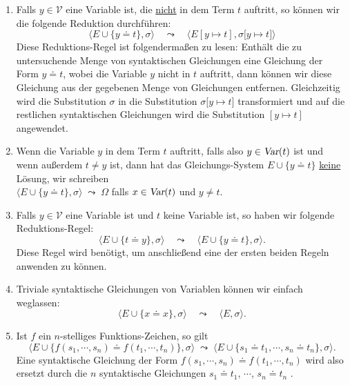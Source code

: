 \begin{enumerate}
\item Falls $y\in\mathcal{V}$ eine Variable ist, die \underline{\color{red}nicht} in dem Term $t$ auftritt, so
      können wir die folgende Reduktion durchführen: 
      \[ \Big\langle E \cup \big\{ y \doteq t \big\}, \sigma \Big\rangle \quad\leadsto\quad 
         \Big\langle E[y \mapsto t], \sigma\big[ y \mapsto t \big] \Big\rangle 
      \]
      Diese Reduktions-Regel ist folgendermaßen zu lesen: Enthält die zu untersuchende
      Menge von syntaktischen Gleichungen eine Gleichung der Form $y \doteq t$, wobei die
      Variable $y$ nicht in $t$ auftritt, dann können wir diese Gleichung aus der
      gegebenen Menge von Gleichungen entfernen.  Gleichzeitig wird die Substitution
      $\sigma$ in die Substitution $\sigma\big[ y \mapsto t \big]$ transformiert und auf die restlichen syntaktischen Gleichungen
      wird die Substitution $[y \mapsto t]$ angewendet.
\item Wenn die Variable $y$  in dem Term $t$ auftritt, falls also $y \in \textsl{Var}(t)$
      ist und wenn außerdem $t \not= y$ ist, dann hat das Gleichungs-System 
      $E \cup \big\{ y \doteq t \big\}$ \underline{\color{red}keine} Lösung, wir schreiben 
      \\[0.2cm]
      \hspace*{1.3cm}
      $\Big\langle E \cup \big\{ y \doteq t \big\}, \sigma \Big\rangle\;\leadsto\; \Omega$ \quad
      falls $x \in \textsl{Var}(t)$ und $y \not=t$.
\item Falls $y\in\mathcal{V}$ eine Variable ist und $t$ keine Variable ist, so haben wir folgende Reduktions-Regel:
      \[ \Big\langle E \cup \big\{ t \doteq y \big\}, \sigma \Big\rangle \quad\leadsto\quad 
         \Big\langle E \cup \big\{ y \doteq t \big\}, \sigma \Big\rangle.
      \]   
      Diese Regel wird benötigt, um anschließend eine der ersten beiden Regeln anwenden zu
      können.
\item Triviale syntaktische Gleichungen von Variablen können wir einfach weglassen:
      \[ \Big\langle E \cup \big\{ x \doteq x \big\}, \sigma \Big\rangle \quad\leadsto\quad
         \Big\langle E, \sigma \Big\rangle.
      \]   
\item Ist $f$ ein $n$-stelliges Funktions-Zeichen, so gilt 
      \[ \Big\langle E \cup \big\{ f(s_1,\cdots,s_n) \doteq f(t_1,\cdots,t_n) \big\}, \sigma \Big\rangle 
         \;\leadsto\; 
         \Big\langle E \cup \big\{ s_1 \doteq t_1, \cdots, s_n \doteq t_n\}, \sigma \Big\rangle.
      \]   
      Eine syntaktische Gleichung der Form $f(s_1,\cdots,s_n) \doteq f(t_1,\cdots,t_n)$
      wird also ersetzt durch die $n$ syntaktische Gleichungen $s_1 \doteq t_1$, $\cdots$, $s_n \doteq t_n$      .


\end{enumerate}

